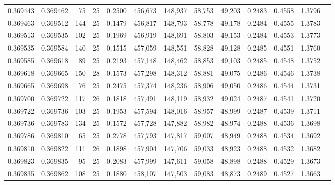 \begin{tabular}{rrrrrrrrrrrrr}
0.369443 & 0.369462 &    75 &  25 &                                     0.2500 & 456,673 & 148,937 &  58,753 &  49,203 & 0.2483 & 0.4558 & 1.3796 \\
0.369463 & 0.369512 &   144 &  25 &                                     0.1479 & 456,817 & 148,793 &  58,778 &  49,178 & 0.2484 & 0.4555 & 1.3783 \\
0.369513 & 0.369535 &   102 &  25 &                                     0.1969 & 456,919 & 148,691 &  58,803 &  49,153 & 0.2484 & 0.4553 & 1.3773 \\
0.369535 & 0.369584 &   140 &  25 &                                     0.1515 & 457,059 & 148,551 &  58,828 &  49,128 & 0.2485 & 0.4551 & 1.3760 \\
0.369585 & 0.369618 &    89 &  25 &                                     0.2193 & 457,148 & 148,462 &  58,853 &  49,103 & 0.2485 & 0.4548 & 1.3752 \\
0.369618 & 0.369665 &   150 &  28 &                                     0.1573 & 457,298 & 148,312 &  58,881 &  49,075 & 0.2486 & 0.4546 & 1.3738 \\
0.369665 & 0.369698 &    76 &  25 &                                     0.2475 & 457,374 & 148,236 &  58,906 &  49,050 & 0.2486 & 0.4544 & 1.3731 \\
0.369700 & 0.369722 &   117 &  26 &                                     0.1818 & 457,491 & 148,119 &  58,932 &  49,024 & 0.2487 & 0.4541 & 1.3720 \\
0.369722 & 0.369736 &   103 &  25 &                                     0.1953 & 457,594 & 148,016 &  58,957 &  48,999 & 0.2487 & 0.4539 & 1.3711 \\
0.369736 & 0.369783 &   134 &  25 &                                     0.1572 & 457,728 & 147,882 &  58,982 &  48,974 & 0.2488 & 0.4536 & 1.3698 \\
0.369786 & 0.369810 &    65 &  25 &                                     0.2778 & 457,793 & 147,817 &  59,007 &  48,949 & 0.2488 & 0.4534 & 1.3692 \\
0.369810 & 0.369822 &   111 &  26 &                                     0.1898 & 457,904 & 147,706 &  59,033 &  48,923 & 0.2488 & 0.4532 & 1.3682 \\
0.369823 & 0.369835 &    95 &  25 &                                     0.2083 & 457,999 & 147,611 &  59,058 &  48,898 & 0.2488 & 0.4529 & 1.3673 \\
0.369835 & 0.369862 &   108 &  25 &                                     0.1880 & 458,107 & 147,503 &  59,083 &  48,873 & 0.2489 & 0.4527 & 1.3663 \\

\end{tabular}
